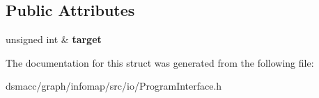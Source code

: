 \subsection*{Public Attributes}
\begin{DoxyCompactItemize}
\item 
\mbox{\label{structIncrementalOption_a214cd383315f67a7988248c1df859ec3}} 
unsigned int \& {\bfseries target}
\end{DoxyCompactItemize}


The documentation for this struct was generated from the following file\+:\begin{DoxyCompactItemize}
\item 
dsmacc/graph/infomap/src/io/Program\+Interface.\+h\end{DoxyCompactItemize}
